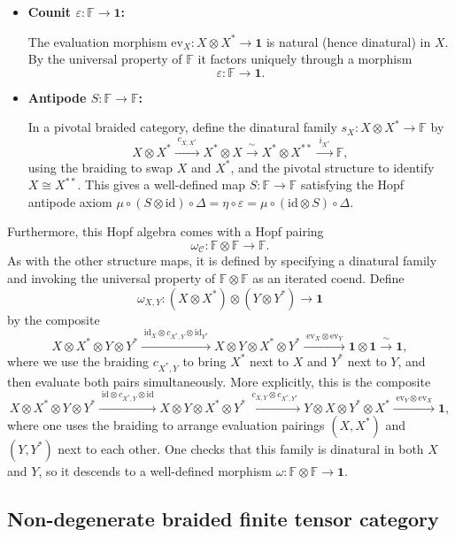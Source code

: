 \documentclass[11pt]{article}
\newcommand{\C}{\mathcal{C}}
\newcommand{\F}{\mathbb{F}}
\newcommand{\one}{\mathbf{1}}
\newcommand{\id}{\mathrm{id}}
\newcommand{\ev}{\mathrm{ev}}
\theoremstyle{definition}
\begin{document}
\begin{itemize}
\item \textbf{Counit $\varepsilon : \F \to \one$:}

The evaluation morphism $\ev_X : X \otimes X^* \to \one$ is natural (hence dinatural) in $X$. By the universal property of $\F$ it factors uniquely through a morphism
\[
\varepsilon : \F \longrightarrow \one.
\]

\item \textbf{Antipode $S : \F \to \F$:}

In a pivotal braided category, define the dinatural family $s_X : X \otimes X^* \to \F$ by
\[
X \otimes X^*
\xrightarrow{\;c_{X, X^*}\;}
X^* \otimes X
\xrightarrow{\;\sim\;}
X^* \otimes X^{**}
\xrightarrow{\;i_{X^*}\;}
\F,
\]
using the braiding to swap $X$ and $X^*$, and the pivotal structure to identify $X \cong X^{**}$. This gives a well-defined map $S : \F \to \F$ satisfying the Hopf antipode axiom $\mu \circ (S \otimes \id) \circ \Delta = \eta \circ \varepsilon = \mu \circ (\id \otimes S) \circ \Delta$.
\end{itemize}

Furthermore, this Hopf algebra comes with a Hopf pairing $$\omega_\C : \F \otimes \F \to \F.$$
As with the other structure maps, it is defined by specifying a dinatural family and invoking the universal property of $\F \otimes \F$ as an iterated coend. Define
\[
\omega_{X,Y} : (X \otimes X^*) \otimes (Y \otimes Y^*) \longrightarrow \one
\]
by the composite
\[
X \otimes X^* \otimes Y \otimes Y^*
\xrightarrow{\;\id_X \otimes c_{X^*,Y} \otimes \id_{Y^*}\;}
X \otimes Y \otimes X^* \otimes Y^*
\xrightarrow{\;\ev_X \otimes \ev_Y\;}
\one \otimes \one
\xrightarrow{\;\sim\;}
\one,
\]
where we use the braiding $c_{X^*,Y}$ to bring $X^*$ next to $X$ and $Y^*$ next to $Y$, and then evaluate both pairs simultaneously. More explicitly, this is the composite
\[
X \otimes X^* \otimes Y \otimes Y^*
\xrightarrow{\;\id \otimes c_{X^*,Y} \otimes \id\;}
X \otimes Y \otimes X^* \otimes Y^*
\xrightarrow{\;c_{X,Y} \otimes c_{X^*,Y^*}\;}
Y \otimes X \otimes Y^* \otimes X^*
\xrightarrow{\;\ev_Y \otimes \ev_X\;}
\one,
\]
where one uses the braiding to arrange evaluation pairings $(X, X^*)$ and $(Y, Y^*)$ next to each other. One checks that this family is dinatural in both $X$ and $Y$, so it descends to a well-defined morphism $\omega : \F \otimes \F \to \one$.




\subsection{Non-degenerate braided finite tensor category}
\end{document}
